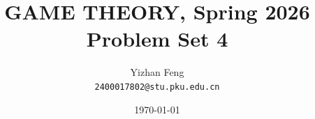 \title{\textbf{GAME THEORY, Spring 2026} \\[0.5em]
    \Large Problem Set 4}
\author{Yizhan Feng \\ 
    \normalsize{\texttt{2400017802@stu.pku.edu.cn}}}
\date{\today}